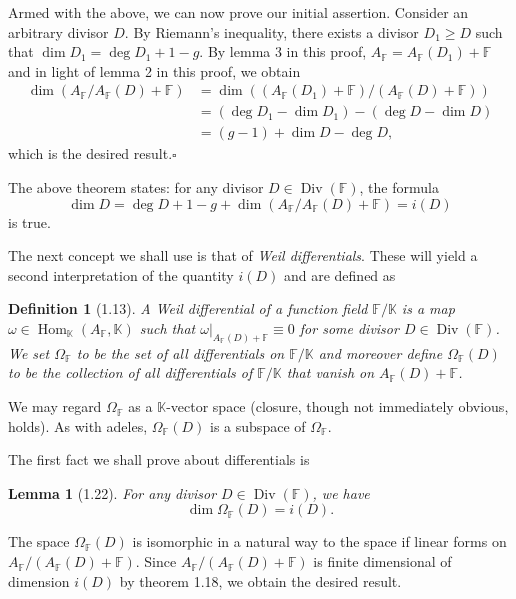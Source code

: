 \documentclass[11pt]{article}
\makeatletter
\theoremstyle{scplain}
\newtheorem*{definition}{Definition}
\newtheorem*{lemma}{Lemma}
\renewenvironment{proof}[1][\proofname]{%
  \par\pushQED{\qed}\normalfont\topsep6\p@\@plus6\p@\relax
  \trivlist\item[\hskip\labelsep\scshape #1\@addpunct{.}]\ignorespaces}%
  {\popQED\endtrivlist\@endpefalse}
\DeclareMathOperator{\Div}{Div}
\DeclareMathOperator{\Hom}{Hom}
\makeatother
\begin{document}
Armed with the above, we can now prove our initial assertion. Consider an
arbitrary divisor $D$. By Riemann's inequality, there exists a divisor
$D_1 \geq D$ such that $\dim D_1 = \deg D_1 + 1 - g$. By lemma 3 in this proof,
$A_{\mathbb{F}} = A_{\mathbb{F}}(D_1)+\mathbb{F}$ and in light of lemma 2 in this
proof, we obtain
\[
\begin{split}
  \dim(A_{\mathbb{F}}/A_{\mathbb{F}}(D)+\mathbb{F})
  &= \dim((A_{\mathbb{F}}(D_1)+\mathbb{F})/(A_{\mathbb{F}}(D)+\mathbb{F})) \\
  &= (\deg D_1-\dim D_1)-(\deg D-\dim D) \\
  &= (g-1)+\dim D-\deg D,
\end{split}
\]
which is the desired result.\hfill$\square$

The above theorem states: for any divisor $D \in \Div(\mathbb{F})$, the formula
\[
  \dim D = \deg D + 1 - g
    + \dim(A_{\mathbb{F}}/A_{\mathbb{F}}(D)+\mathbb{F}) = i(D)
\]
is true.

The next concept we shall use is that of \emph{Weil differentials}. These will
yield a second interpretation of the quantity $i(D)$ and are defined as

\begin{definition}[1.13]
A Weil differential of a function field $\mathbb{F}/\mathbb{K}$ is a map
$\omega \in \Hom_{\mathbb{K}}(A_{\mathbb{F}},\mathbb{K})$ such that
$\omega\big|_{A_{\mathbb{F}}(D)+\mathbb{F}} \equiv 0$ for some divisor
$D \in \Div(\mathbb{F})$. We set $\Omega_{\mathbb{F}}$ to be the set of all
differentials on $\mathbb{F}/\mathbb{K}$ and moreover define
$\Omega_{\mathbb{F}}(D)$ to be the collection of all differentials of
$\mathbb{F}/\mathbb{K}$ that vanish on $A_{\mathbb{F}}(D)+\mathbb{F}$.
\end{definition}

We may regard $\Omega_{\mathbb{F}}$ as a $\mathbb{K}$-vector space (closure,
though not immediately obvious, holds). As with adeles,
$\Omega_{\mathbb{F}}(D)$ is a subspace of $\Omega_{\mathbb{F}}$.

The first fact we shall prove about differentials is

\begin{lemma}[1.22]
For any divisor $D \in \Div(\mathbb{F})$, we have
\[
  \dim \Omega_{\mathbb{F}}(D) = i(D).
\]
\end{lemma}

\begin{proof}
The space $\Omega_{\mathbb{F}}(D)$ is isomorphic in a natural way to the space
if linear forms on $A_{\mathbb{F}}/(A_{\mathbb{F}}(D)+\mathbb{F})$. Since
$A_{\mathbb{F}}/(A_{\mathbb{F}}(D)+\mathbb{F})$ is finite dimensional of
dimension $i(D)$ by theorem 1.18, we obtain the desired result.
\end{proof}
\end{document}
